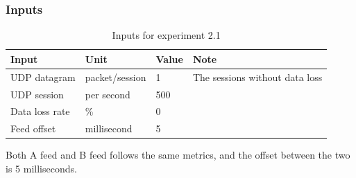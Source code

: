 \documentclass[11pt,openright,a4paper]{report}
\begin{document}
\subsubsection{Inputs}
\begin{table}[H]
	\centering
	\caption{Inputs for experiment 2.1}
	\label{my-label}
	\begin{tabular}{@{}llll@{}}
		\toprule
		Input          & Unit & Value           & Note                           \\ \midrule
		UDP datagram   & packet/session & 1     & The sessions without data loss \\
		UDP session & per second   & 500         &                                \\
		Data loss rate & \%   & 0         &                                \\
		Feed offset & millisecond   & 5         &                                \\
		\bottomrule
	\end{tabular}
\end{table}
Both A feed and B feed follows the same metrics, and the offset between the two is 5 milliseconds.
\end{document}
